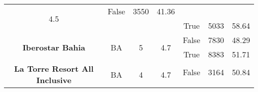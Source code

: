 \begin{table}[]
{\begin{tabular}{|c|c|c|c|c|r|r|}
			\multirow{2}{*}{4.5}                                            &
			False                                                           &
			3550                                                            &
			41.36                                                             \\ \cline{5-7}
			                                                                &
			                                                                &
			                                                                &
			                                                                &
			True                                                            &
			5033                                                            &
			58.64                                                             \\ \hline
			\multirow{2}{*}{\textbf{Iberostar Bahia}}                       &
			\multirow{2}{*}{BA}                                             &
			\multirow{2}{*}{5}                                              &
			\multirow{2}{*}{4.7}                                            &
			False                                                           &
			7830                                                            &
			48.29                                                             \\ \cline{5-7}
			                                                                &
			                                                                &
			                                                                &
			                                                                &
			True                                                            &
			8383                                                            &
			51.71                                                             \\ \hline
			\multirow{2}{*}{\textbf{La Torre Resort All Inclusive}}         &
			\multirow{2}{*}{BA}                                             &
			\multirow{2}{*}{4}                                              &
			\multirow{2}{*}{4.7}                                            &
			False                                                           &
			3164                                                            &
			50.84                                                             \\ \cline{5-7}
			                                                                &
			                                                                &

\end{tabular}}
\end{table}
